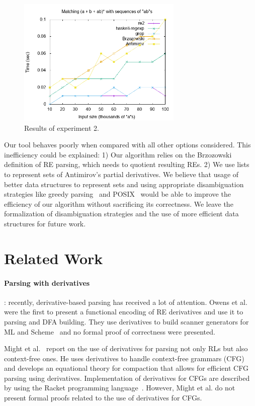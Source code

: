 \documentclass[review]{elsarticle}
\begin{document}
\begin{figure}[!ht]
    \includegraphics[width=0.7\textwidth]{abs.png}
   \centering
   \caption{Results of experiment 2.}
   \label{fig:graph2}
\end{figure}

Our tool behaves poorly when compared with all other options
considered. This inefficiency could be explained: 1) Our algorithm
relies on the Brzozowski definition of RE parsing, which needs to
quotient resulting REs. 2) We use lists to represent sets of Antimirov's
partial derivatives. We believe that usage of better data structures
to represent sets and using appropriate disambiguation strategies
like greedy parsing~\cite{FrischC04} and POSIX~\cite{SulzmannL14}
would be able to improve the efficiency of our algorithm without
sacrificing its correctness. We leave the formalization of
disambiguation strategies and the use of more efficient
data structures for future work.

\section{Related Work}\label{sec:related}

\paragraph{Parsing with derivatives}: recently, derivative-based parsing has
received a lot of attention. Owens et al. were the first to present a
functional encoding of RE derivatives and use it to parsing and DFA
building. They use derivatives to build scanner generators for ML and
Scheme~\cite{Owens2009} and no formal proof of correctness were
presented.

Might et al.~\cite{Might2011} report on
the use of derivatives for parsing not only RLs but also context-free
ones. He uses derivatives to handle context-free grammars (CFG) and
develops an equational theory for compaction that allows for efficient
CFG parsing using derivatives. Implementation of derivatives for CFGs
are described by using the Racket programming
language~\cite{Felleisen2013}. However, Might et al. do not present
formal proofs related to the use of derivatives for CFGs.
\end{document}
